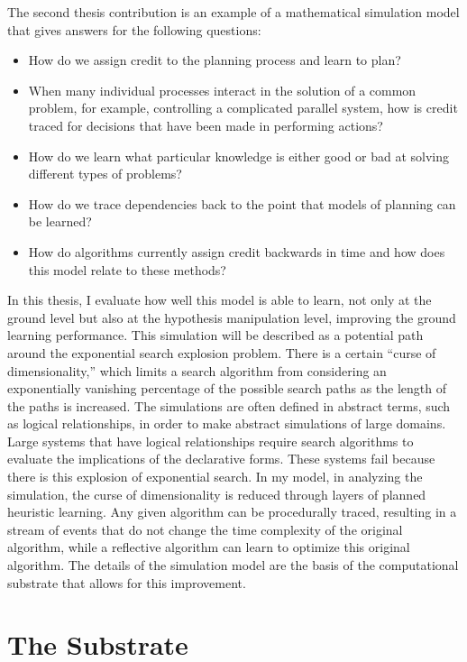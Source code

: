 The second thesis contribution is an example of a mathematical
simulation model that gives answers for the following questions:
\begin{itemize}
\item How do we assign credit to the planning process and learn to
  plan?
\item When many individual processes interact in the solution of a
  common problem, for example, controlling a complicated parallel
  system, how is credit traced for decisions that have been made in
  performing actions?
\item How do we learn what particular knowledge is either good or bad
  at solving different types of problems?
\item How do we trace dependencies back to the point that models of
  planning can be learned?
\item How do algorithms currently assign credit backwards in time and
  how does this model relate to these methods?
\end{itemize}

In this thesis, I evaluate how well this model is able to learn, not
only at the ground level but also at the hypothesis manipulation
level, improving the ground learning performance.  This simulation
will be described as a potential path around the exponential search
explosion problem.  There is a certain ``curse of dimensionality,''
which limits a search algorithm from considering an exponentially
vanishing percentage of the possible search paths as the length of the
paths is increased.  The simulations are often defined in abstract
terms, such as logical relationships, in order to make abstract
simulations of large domains.  Large systems that have logical
relationships require search algorithms to evaluate the implications
of the declarative forms.  These systems fail because there is this
explosion of exponential search.  In my model, in analyzing the
simulation, the curse of dimensionality is reduced through layers of
planned heuristic learning.  Any given algorithm can be procedurally
traced, resulting in a stream of events that do not change the time
complexity of the original algorithm, while a reflective algorithm can
learn to optimize this original algorithm.  The details of the
simulation model are the basis of the computational substrate that
allows for this improvement.

\section{The Substrate}

